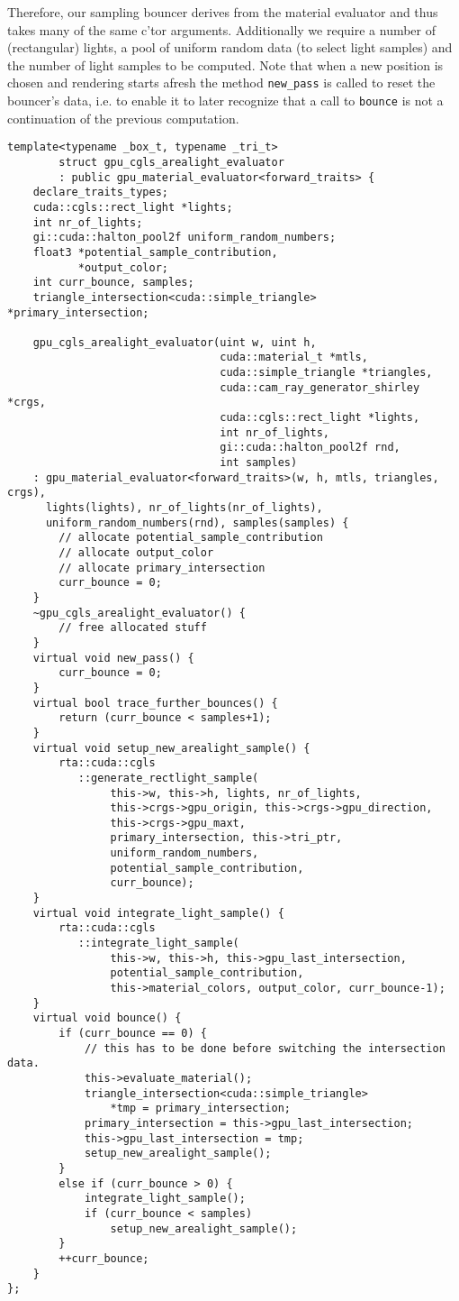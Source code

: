 \documentclass[a4paper,11pt]{scrartcl}
\begin{document}
Therefore, our sampling bouncer derives from the material evaluator and thus takes many of the same c'tor arguments.
Additionally we require a number of (rectangular) lights, a pool of uniform random data (to select light samples) and 
	the number of light samples to be computed.
Note that when a new position is chosen and rendering starts afresh the method \lstinline|new_pass| is called to reset the bouncer's data, 
	i.e. to enable it to later recognize that a call to \lstinline|bounce| is not a continuation of the previous computation.
\begin{lstlisting}
template<typename _box_t, typename _tri_t> 
		struct gpu_cgls_arealight_evaluator 
		: public gpu_material_evaluator<forward_traits> {
	declare_traits_types;
	cuda::cgls::rect_light *lights;
	int nr_of_lights;
	gi::cuda::halton_pool2f uniform_random_numbers;
	float3 *potential_sample_contribution,
	       *output_color; 
	int curr_bounce, samples;
	triangle_intersection<cuda::simple_triangle> *primary_intersection;

	gpu_cgls_arealight_evaluator(uint w, uint h,
	                             cuda::material_t *mtls, 
	                             cuda::simple_triangle *triangles, 
								 cuda::cam_ray_generator_shirley *crgs, 
								 cuda::cgls::rect_light *lights, 
								 int nr_of_lights,
								 gi::cuda::halton_pool2f rnd, 
								 int samples)
	: gpu_material_evaluator<forward_traits>(w, h, mtls, triangles, crgs), 
	  lights(lights), nr_of_lights(nr_of_lights), 
	  uniform_random_numbers(rnd), samples(samples) {
	    // allocate potential_sample_contribution
	    // allocate output_color
	    // allocate primary_intersection
		curr_bounce = 0;
	}
	~gpu_cgls_arealight_evaluator() {
		// free allocated stuff
	}
	virtual void new_pass() {
		curr_bounce = 0;
	}
	virtual bool trace_further_bounces() {
		return (curr_bounce < samples+1);
	}
	virtual void setup_new_arealight_sample() {
		rta::cuda::cgls
		   ::generate_rectlight_sample(
		   		this->w, this->h, lights, nr_of_lights, 
				this->crgs->gpu_origin, this->crgs->gpu_direction, 
				this->crgs->gpu_maxt,
				primary_intersection, this->tri_ptr, 
				uniform_random_numbers, 
				potential_sample_contribution, 
				curr_bounce);
	}
	virtual void integrate_light_sample() {
		rta::cuda::cgls
		   ::integrate_light_sample(
		   		this->w, this->h, this->gpu_last_intersection, 
				potential_sample_contribution,
				this->material_colors, output_color, curr_bounce-1);
	}
	virtual void bounce() {
		if (curr_bounce == 0) {
			// this has to be done before switching the intersection data.
			this->evaluate_material();
			triangle_intersection<cuda::simple_triangle> 
				*tmp = primary_intersection;
			primary_intersection = this->gpu_last_intersection;
			this->gpu_last_intersection = tmp;
			setup_new_arealight_sample();
		}
		else if (curr_bounce > 0) {
			integrate_light_sample();
			if (curr_bounce < samples)
				setup_new_arealight_sample();
		}
		++curr_bounce;
	}
};
\end{lstlisting}
\end{document}
